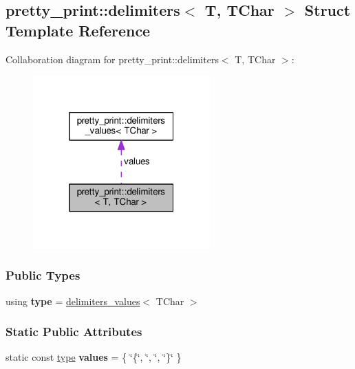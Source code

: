\hypertarget{structpretty__print_1_1delimiters}{}\subsection{pretty\+\_\+print\+:\+:delimiters$<$ T, T\+Char $>$ Struct Template Reference}
\label{structpretty__print_1_1delimiters}


Collaboration diagram for pretty\+\_\+print\+:\+:delimiters$<$ T, T\+Char $>$\+:\nopagebreak
\begin{figure}[H]
\begin{center}
\leavevmode
\includegraphics[width=193pt]{structpretty__print_1_1delimiters__coll__graph}
\end{center}
\end{figure}
\subsubsection*{Public Types}
\begin{DoxyCompactItemize}
\item 
using {\bfseries type} = \hyperlink{structpretty__print_1_1delimiters__values}{delimiters\+\_\+values}$<$ T\+Char $>$\hypertarget{structpretty__print_1_1delimiters_a910c8cec995b089e2b36dd2f05d32e66}{}\label{structpretty__print_1_1delimiters_a910c8cec995b089e2b36dd2f05d32e66}

\end{DoxyCompactItemize}
\subsubsection*{Static Public Attributes}
\begin{DoxyCompactItemize}
\item 
static const \hyperlink{structpretty__print_1_1delimiters__values}{type} {\bfseries values} = \{ \char`\"{}\{\char`\"{}, \char`\"{}, \char`\"{}, \char`\"{}\}\char`\"{} \}\hypertarget{structpretty__print_1_1delimiters_a5755b097e2266e0119ac5819ad88cd45}{}\label{structpretty__print_1_1delimiters_a5755b097e2266e0119ac5819ad88cd45}

\end{DoxyCompactItemize}



